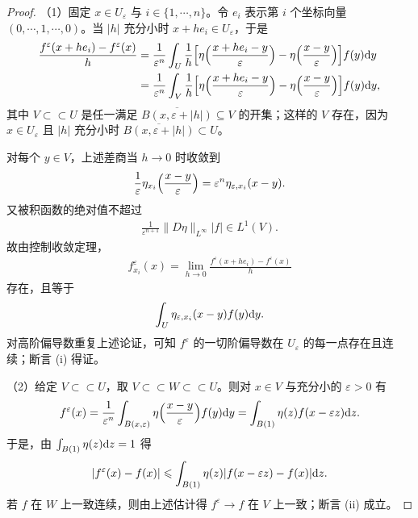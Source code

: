 \documentclass[../../main.tex]{subfiles}%
\begin{document}
\begin{proof}
（1）固定 $x\in U_\varepsilon$ 与 $i\in\{1,\cdots,n\}$。令 $e_i$ 表示第 $i$ 个坐标向量 $(0,\cdots,1,\cdots,0)$。当 $\lvert h\rvert$ 充分小时 $x+he_i\in U_\varepsilon$，于是
\begin{align*}
\frac{f^\varepsilon(x+he_i)-f^\varepsilon(x)}{h}
&=\frac{1}{\varepsilon^n}\int_U\frac{1}{h}\Bigl[\eta\Bigl(\frac{x+he_i-y}{\varepsilon}\Bigr)-\eta\Bigl(\frac{x-y}{\varepsilon}\Bigr)\Bigr]f(y)\mathrm{d} y\\
&=\frac{1}{\varepsilon^n}\int_V\frac{1}{h}\Bigl[\eta\Bigl(\frac{x+he_i-y}{\varepsilon}\Bigr)-\eta\Bigl(\frac{x-y}{\varepsilon}\Bigr)\Bigr]f(y)\mathrm{d} y,
\end{align*}
其中 $V\subset\subset U$ 是任一满足 $\overline{B(x,\varepsilon+\lvert h\rvert)}\subseteq V$ 的开集；这样的 $V$ 存在，因为 $x\in U_\varepsilon$ 且 $\lvert h\rvert$ 充分小时 $\overline{B(x,\varepsilon+\lvert h\rvert)}\subset U$。

对每个 $y\in V$，上述差商当 $h\to0$ 时收敛到
\begin{align*}
\frac{1}{\varepsilon}\eta_{x_i}\Bigl(\frac{x-y}{\varepsilon}\Bigr)=\varepsilon^n\eta_{\varepsilon,x_i}(x-y).
\end{align*}
又被积函数的绝对值不超过
\begin{align*}
\frac{1}{\varepsilon^{n+1}}\lVert D\eta\rVert_{L^\infty}\lvert f\rvert\in L^1(V).
\end{align*}
故由控制收敛定理，
\begin{align*}
f^\varepsilon_{x_i}(x)=\lim_{h\to0}\frac{f^\varepsilon(x+he_i)-f^\varepsilon(x)}{h}
\end{align*}
存在，且等于
\begin{align*}
\int_U\eta_{\varepsilon,x_i}(x-y)f(y)\mathrm{d} y.
\end{align*}
对高阶偏导数重复上述论证，可知 $f^\varepsilon$ 的一切阶偏导数在 $U_\varepsilon$ 的每一点存在且连续；断言 (i) 得证。

（2）给定 $V\subset\subset U$，取 $V\subset\subset W\subset\subset U$。则对 $x\in V$ 与充分小的 $\varepsilon>0$ 有
\begin{align*}
f^\varepsilon(x)=\frac{1}{\varepsilon^n}\int_{B(x,\varepsilon)}\eta\Bigl(\frac{x-y}{\varepsilon}\Bigr)f(y)\mathrm{d} y=\int_{B(1)}\eta(z)f(x-\varepsilon z)\mathrm{d} z.
\end{align*}
于是，由 $\int_{B(1)}\eta(z)\mathrm{d} z=1$ 得
\begin{align*}
\lvert f^\varepsilon(x)-f(x)\rvert\leqslant\int_{B(1)}\eta(z)\lvert f(x-\varepsilon z)-f(x)\rvert\mathrm{d} z.
\end{align*}
若 $f$ 在 $W$ 上一致连续，则由上述估计得 $f^\varepsilon\to f$ 在 $V$ 上一致；断言 (ii) 成立。


\end{proof}
\end{document}
